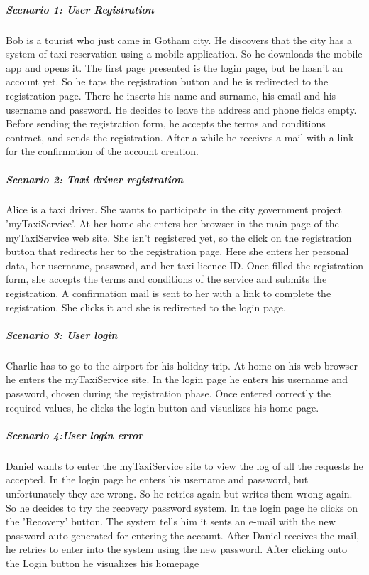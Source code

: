 \subparagraph{Scenario 1: User Registration}
\noindent
\newline
    Bob is a tourist who just came in Gotham city. He discovers that the city has a system of taxi reservation using a mobile application. So he downloads the mobile app and opens it. The first page presented is the login page, but he hasn't an account yet. So he taps the registration button and he is redirected to the registration page. There he inserts his name and surname, his email and his username and password. He decides to leave the address and phone fields empty.
    Before sending the registration form, he accepts the terms and conditions contract, and sends the registration.
    After a while he receives a mail with a link for the confirmation of the account creation.

\subparagraph{Scenario 2: Taxi driver registration}
\noindent
\newline
    Alice is a taxi driver. She wants to participate in the city government project 'myTaxiService'. At her home she enters her browser in the main page of the myTaxiService web site. She isn't registered yet, so the click on the registration button that redirects her to the registration page. Here she enters her personal data, her username, password, and her taxi licence ID. Once filled the registration form, she accepts the terms and conditions of the service and submits the registration. A confirmation mail is sent to her with a link to complete the registration. She clicks it and she is redirected to the login page.

\subparagraph{Scenario 3: User login}
\noindent
\newline
    Charlie has to go to the airport for his holiday trip. At home on his web browser he enters the myTaxiService site. In the login page he enters his username and password, chosen during the registration phase. Once entered correctly the required values, he clicks the login button and visualizes his home page.

\subparagraph{Scenario 4:User login error}
\noindent
\newline
    Daniel wants to enter the myTaxiService site to view the log of all the requests he accepted. In the login page he enters his username and password, but unfortunately they are wrong. So he retries again but writes them wrong again.
    So he decides to try the recovery password system. In the login page he clicks on the 'Recovery' button. The system tells him it sents an e-mail with the new password auto-generated for entering the account.
    After Daniel receives the mail, he retries to enter into the system using the new password. After clicking onto the Login button he visualizes his homepage

